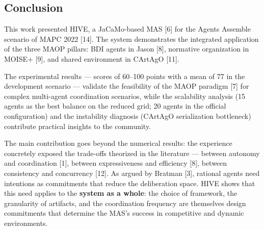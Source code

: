 \documentclass[11pt,a4paper]{article}
\begin{document}
\subsection{Conclusion}
This work presented HIVE, a JaCaMo-based MAS [6] for the Agents Assemble scenario of MAPC 2022 [14]. The system demonstrates the integrated application of the three MAOP pillars: BDI agents in Jason [8], normative organization in MOISE+ [9], and shared environment in CArtAgO [11].

The experimental results --- scores of 60--100 points with a mean of 77 in the development scenario --- validate the feasibility of the MAOP paradigm [7] for complex multi-agent coordination scenarios, while the scalability analysis (15 agents as the best balance on the reduced grid; 20 agents in the official configuration) and the instability diagnosis (CArtAgO serialization bottleneck) contribute practical insights to the community.

The main contribution goes beyond the numerical results: the experience concretely exposed the trade-offs theorized in the literature --- between autonomy and coordination [1], between expressiveness and efficiency [8], between consistency and concurrency [12]. As argued by Bratman [3], rational agents need intentions as commitments that reduce the deliberation space. HIVE shows that this need applies to the \textbf{system as a whole}: the choice of framework, the granularity of artifacts, and the coordination frequency are themselves design commitments that determine the MAS's success in competitive and dynamic environments.

\end{document}
